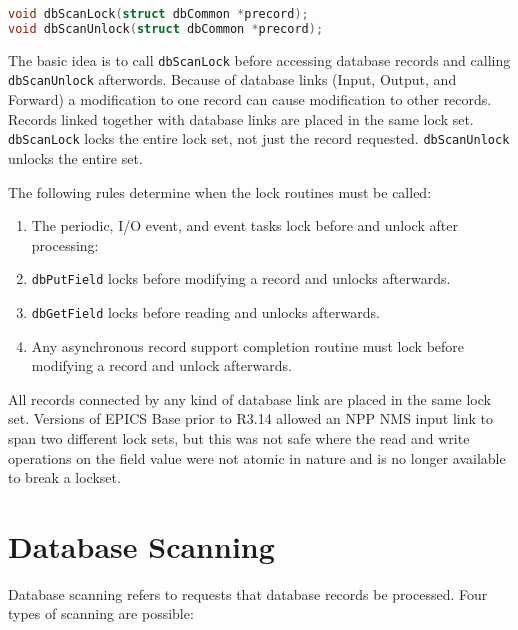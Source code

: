 \begin{lstlisting}[language=C]
void dbScanLock(struct dbCommon *precord);
void dbScanUnlock(struct dbCommon *precord);
\end{lstlisting}

The basic idea is to call \verb|dbScanLock| before accessing database records and calling \verb|dbScanUnlock| afterwords.
Because of database links (Input, Output, and Forward) a modification to one record can cause modification to other records.
Records linked together with database links are placed in the same lock set.
\verb|dbScanLock| locks the entire lock set, not just the record requested.
\verb|dbScanUnlock| unlocks the entire set.

The following rules determine when the lock routines must be called:

\begin{enumerate}
\item The periodic, I/O event, and event tasks lock before and unlock after processing:

\item \verb|dbPutField| locks before modifying a record and unlocks afterwards.

\item \verb|dbGetField| locks before reading and unlocks afterwards.

\item Any asynchronous record support completion routine must lock before modifying a record and unlock afterwards.

\end{enumerate}

All records connected by any kind of database link are placed in the same lock set.
Versions of EPICS Base prior to R3.14 allowed an NPP NMS input link to span two different lock sets, but this was not safe where the read and write operations on the field value were not atomic in nature and is no longer available to break a lockset.

\section{Database Scanning}

Database scanning refers to requests that database records be processed.
Four types of scanning are possible:

